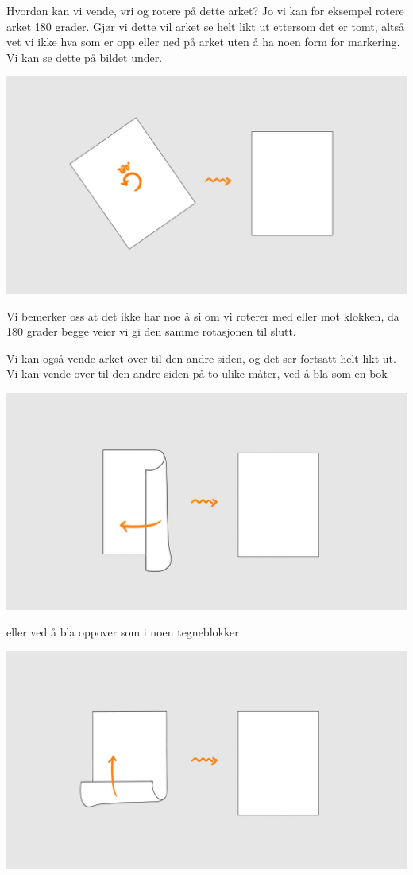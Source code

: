 Hvordan kan vi vende, 
vri og rotere på dette arket? 
Jo vi kan for eksempel rotere arket 180 grader. 
Gjør vi dette vil arket se helt likt ut ettersom det er tomt, 
altså vet vi ikke hva som er opp eller ned på arket uten å ha noen form for markering. 
Vi kan se dette på bildet under. 
\begin{center}
\includegraphics[width=\textwidth]{img/rotate.jpg}
\end{center}

Vi bemerker oss at det ikke har noe å si om vi roterer med eller mot klokken, 
da 180 grader begge veier vi gi den samme rotasjonen til slutt. 

Vi kan også vende arket over til den andre siden, 
og det ser fortsatt helt likt ut. 
Vi kan vende over til den andre siden på to ulike måter, 
ved å bla som en bok
\begin{center}
\includegraphics[width=\textwidth]{img/flip.jpg}
\end{center}

eller ved å bla oppover som i noen tegneblokker
\begin{center}
\includegraphics[width=\textwidth]{img/flip2.jpg}
\end{center}


